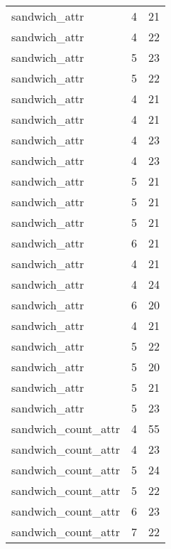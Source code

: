 \begin{table}
\begin{tabular}{lrr}
                   sandwich\_attr &         4 &        21 \\
                   sandwich\_attr &         4 &        22 \\
                   sandwich\_attr &         5 &        23 \\
                   sandwich\_attr &         5 &        22 \\
                   sandwich\_attr &         4 &        21 \\
                   sandwich\_attr &         4 &        21 \\
                   sandwich\_attr &         4 &        23 \\
                   sandwich\_attr &         4 &        23 \\
                   sandwich\_attr &         5 &        21 \\
                   sandwich\_attr &         5 &        21 \\
                   sandwich\_attr &         5 &        21 \\
                   sandwich\_attr &         6 &        21 \\
                   sandwich\_attr &         4 &        21 \\
                   sandwich\_attr &         4 &        24 \\
                   sandwich\_attr &         6 &        20 \\
                   sandwich\_attr &         4 &        21 \\
                   sandwich\_attr &         5 &        22 \\
                   sandwich\_attr &         5 &        20 \\
                   sandwich\_attr &         5 &        21 \\
                   sandwich\_attr &         5 &        23 \\
             sandwich\_count\_attr &         4 &        55 \\
             sandwich\_count\_attr &         4 &        23 \\
             sandwich\_count\_attr &         5 &        24 \\
             sandwich\_count\_attr &         5 &        22 \\
             sandwich\_count\_attr &         6 &        23 \\
             sandwich\_count\_attr &         7 &        22 \\

\end{tabular}
\end{table}

